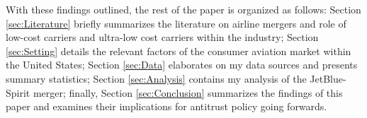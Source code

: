\documentclass{article}
\begin{document}
    With these findings outlined, the rest of the paper is organized as follows: Section \ref{sec:Literature} briefly summarizes the literature on airline mergers and role of low-cost carriers and ultra-low cost carriers within the industry; Section \ref{sec:Setting} details the relevant factors of the consumer aviation market within the United States; Section \ref{sec:Data} elaborates on my data sources and presents summary statistics; Section \ref{sec:Analysis} contains my analysis of the JetBlue-Spirit merger; finally, Section \ref{sec:Conclusion} summarizes the findings of this paper and examines their implications for antitrust policy going forwards. 

    
    \pagebreak 
	 
	
\end{document}
